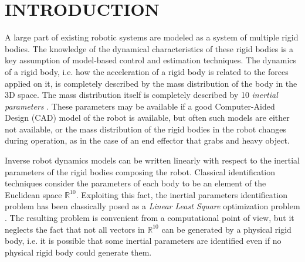\section{INTRODUCTION}
A large part of existing robotic systems are modeled as a system of multiple rigid bodies. 
The knowledge of the dynamical characteristics of these rigid bodies is a key assumption of model-based control and estimation techniques. The dynamics of a rigid body, i.e. how the acceleration of a rigid body is related to the forces applied on it, is completely described by the mass distribution of the body in the 3D space. 
The mass distribution itself is completely described by 10 \emph{inertial parameters} \cite{hollerbach2008model}. These parameters may be available if a good Computer-Aided Design (CAD) model of the robot is available, but often such models are either not available, or the mass distribution of the rigid bodies in the robot changes during operation, as in the case of an end effector that grabs and heavy object. 


Inverse robot dynamics models can be written linearly with respect to the inertial parameters of the rigid bodies composing the robot. Classical identification techniques \cite{hollerbach2008model,ayusawa2014identifiability} consider the parameters of each body to be an element of the Euclidean space $\mathbb{R}^{10}$. Exploiting this fact, the inertial parameters identification problem has been classically posed as a \emph{Linear Least Square} optimization problem \cite{hollerbach2008model}. The resulting problem is convenient from a computational point of view, but it neglects the fact that not all vectors in $\mathbb{R}^{10}$ can be generated by a physical rigid body, i.e. it is possible that some inertial parameters are identified even if no physical rigid body could generate them. 

